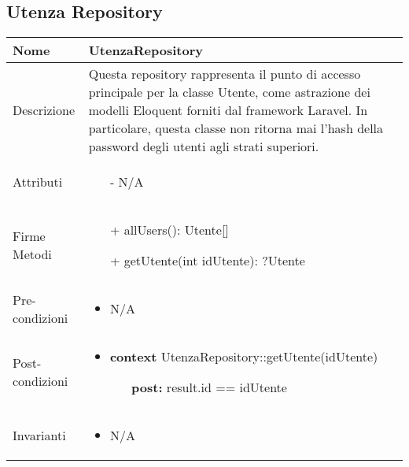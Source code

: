 \subsection{Utenza Repository}
\small\begin{tabular}{|| l | p{34em} ||} 
	\hline
	Nome & UtenzaRepository\\
	\hline
	Descrizione & Questa repository rappresenta il punto di accesso principale per la classe Utente, come astrazione dei modelli Eloquent forniti dal framework Laravel. In particolare, questa classe non ritorna mai l'hash della password degli utenti agli strati superiori.\\
	\hline
	Attributi & \begin{itemize}
		\item[-] N/A
	\end{itemize}\\
	\hline
	Firme Metodi & \begin{itemize}
		\item[+] allUsers(): Utente[]
		\item[+] getUtente(int idUtente): ?Utente
	\end{itemize}\\
	\hline
Pre-condizioni & \begin{itemize}[leftmargin=*]
	\item N/A
\end{itemize}\\
\hline
Post-condizioni & \begin{itemize}[leftmargin=*]
	\item \textbf{context} UtenzaRepository::getUtente(idUtente)
	\begin{itemize}
		\item[ ] \textbf{post:} result.id == idUtente
	\end{itemize}
\end{itemize}\\
\hline
Invarianti & \begin{itemize}
	\item N/A
\end{itemize}\\
\hline
\end{tabular}

\newpage
